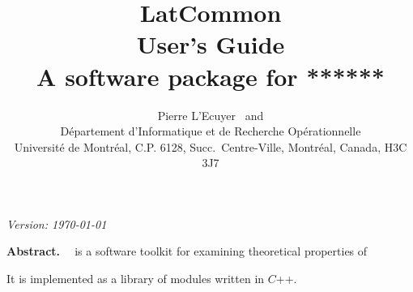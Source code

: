 % 
% 
% 
% 

\begin  {titlepage}
\null
\begin{flushright}
 {\it  Version: \today } 
\end{flushright}
\vfill
%
\title  { \huge\bf  LatCommon \medskip \\ \LARGE\bf User's Guide\\ \bigskip
          \large\bf A software package for  ****** }

\author { Pierre L'Ecuyer \ and  \\ \medskip
          \small\rm  %
          D\'epartement d'Informatique et de Recherche Op\'erationnelle \\
          Universit\'e de Montr\'eal, C.P. 6128, Succ.\ Centre-Ville,
          Montr\'eal, Canada, H3C 3J7 }

{\noindent\large\bf Abstract. \ }
{\latcom} is a software toolkit for examining theoretical properties of

It is implemented as a library of modules written in $C${\small ++}.



\end {titlepage}

